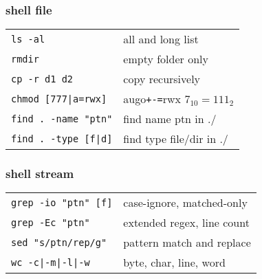 \documentclass[10pt]{article}
\newcommand{\code}[1]{\texttt{#1}}
\begin{document}
\begin{multicols*}{2}

    \subsubsection*{shell file}

    \begin{tcolorbox}[halign=left]
        \begin{tabular}{p{85pt}|p{120pt}}
            \texttt{ls -al}             & all and long list                              \\
            \texttt{rmdir}              & empty folder only                              \\
            \texttt{cp -r d1 d2}        & copy recursively                               \\
            \texttt{chmod [777|a=rwx]}  & augo\texttt{+-=}rwx $7_{10}=111_{2}$ \\
            \texttt{find . -name "ptn"} & find name ptn in ./                            \\
            \texttt{find . -type [f|d]} & find type file/dir in ./                       \\
        \end{tabular}
    \end{tcolorbox}

    \subsubsection*{shell stream}

    \begin{tcolorbox}[halign=left]
        \begin{tabular}{p{85pt}|p{120pt}}
            \texttt{grep -io "ptn" [f]} & case-ignore, matched-only  \\
            \texttt{grep -Ec "ptn"}     & extended regex, line count \\
            \texttt{sed "s/ptn/rep/g"}  & pattern match and replace  \\

            \texttt{wc -c|-m|-l|-w}     & byte, char, line, word     \\


\end{tabular}
\end{tcolorbox}
\end{multicols*}
\end{document}
